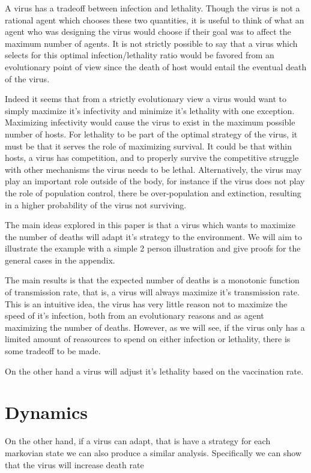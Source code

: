 \documentclass[12pt]{report}
\numberwithin{equation}{section}
\begin{document}
A virus has a tradeoff between infection and lethality. Though the virus is not a rational agent which chooses these two quantities, it is useful to think of what an agent who was designing the virus would choose if their goal was to affect the maximum number of agents. It is not strictly possible to say that a virus which selects for this optimal infection/lethality ratio would be favored from an evolutionary point of view since the death of host would entail the eventual death of the virus. 

Indeed it seems that from a strictly evolutionary view a virus would want to simply maximize it's infectivity and minimize it's lethality with one exception. Maximizing infectivity would cause the virus to exist in the maximum possible number of hosts. For lethality to be part of the optimal strategy of the virus, it must be that it serves the role of maximizing survival. It could be that within hosts, a virus has competition, and to properly survive the competitive struggle with other mechanisms the virus needs to be lethal. Alternatively, the virus may play an important role outside of the body, for instance if the virus does not play the role of population control, there be over-population and extinction, resulting in a higher probability of the virus not surviving. 

The main ideas explored in this paper is that a virus which wants to maximize the number of deaths will adapt it's strategy to the environment. We will aim to illustrate the example with a simple 2 person illustration and give proofs for the general cases in the appendix. 

The main results is that the expected number of deaths is a monotonic function of transmission rate, that is, a virus will always maximize it's transmission rate. This is an intuitive idea, the virus has very little reason not to maximize the speed of it's infection, both from an evolutionary reasons and as agent maximizing the number of deaths. However, as we will see, if the virus only has a limited amount of reasources to spend on either infection or lethality, there is some tradeoff to be made. 

On the other hand a virus will adjust it's lethality based on the vaccination rate. 


\section{Dynamics}

On the other hand, if a virus can adapt, that is have a strategy for each markovian state we can also produce a similar analysis. Specifically we can show that the virus will increase death rate 
\end{document}
